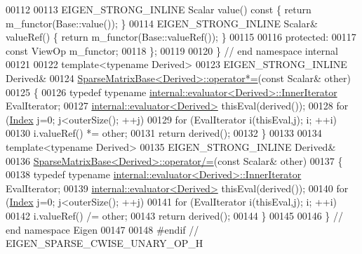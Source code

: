 \begin{DoxyCode}
00112 
00113     EIGEN\_STRONG\_INLINE Scalar value()\textcolor{keyword}{ const }\{ \textcolor{keywordflow}{return} m\_functor(Base::value()); \}
00114     EIGEN\_STRONG\_INLINE Scalar& valueRef() \{ \textcolor{keywordflow}{return} m\_functor(Base::valueRef()); \}
00115 
00116   \textcolor{keyword}{protected}:
00117     \textcolor{keyword}{const} ViewOp m\_functor;
00118 \};
00119 
00120 \} \textcolor{comment}{// end namespace internal}
00121 
00122 \textcolor{keyword}{template}<\textcolor{keyword}{typename} Derived>
00123 EIGEN\_STRONG\_INLINE Derived&
00124 \hyperlink{group___sparse_core___module_class_eigen_1_1_sparse_matrix_base}{SparseMatrixBase<Derived>::operator*=}(\textcolor{keyword}{const} Scalar& other)
00125 \{
00126   \textcolor{keyword}{typedef} \textcolor{keyword}{typename} \hyperlink{struct_eigen_1_1internal_1_1evaluator}{internal::evaluator<Derived>::InnerIterator} 
      EvalIterator;
00127   \hyperlink{struct_eigen_1_1internal_1_1evaluator}{internal::evaluator<Derived>} thisEval(derived());
00128   \textcolor{keywordflow}{for} (\hyperlink{namespace_eigen_a62e77e0933482dafde8fe197d9a2cfde}{Index} j=0; j<outerSize(); ++j)
00129     \textcolor{keywordflow}{for} (EvalIterator i(thisEval,j); i; ++i)
00130       i.valueRef() *= other;
00131   \textcolor{keywordflow}{return} derived();
00132 \}
00133 
00134 \textcolor{keyword}{template}<\textcolor{keyword}{typename} Derived>
00135 EIGEN\_STRONG\_INLINE Derived&
00136 \hyperlink{group___sparse_core___module_class_eigen_1_1_sparse_matrix_base}{SparseMatrixBase<Derived>::operator/=}(\textcolor{keyword}{const} Scalar& other)
00137 \{
00138   \textcolor{keyword}{typedef} \textcolor{keyword}{typename} \hyperlink{struct_eigen_1_1internal_1_1evaluator}{internal::evaluator<Derived>::InnerIterator} 
      EvalIterator;
00139   \hyperlink{struct_eigen_1_1internal_1_1evaluator}{internal::evaluator<Derived>} thisEval(derived());
00140   \textcolor{keywordflow}{for} (\hyperlink{namespace_eigen_a62e77e0933482dafde8fe197d9a2cfde}{Index} j=0; j<outerSize(); ++j)
00141     \textcolor{keywordflow}{for} (EvalIterator i(thisEval,j); i; ++i)
00142       i.valueRef() /= other;
00143   \textcolor{keywordflow}{return} derived();
00144 \}
00145 
00146 \} \textcolor{comment}{// end namespace Eigen}
00147 
00148 \textcolor{preprocessor}{#endif // EIGEN\_SPARSE\_CWISE\_UNARY\_OP\_H}
\end{DoxyCode}
